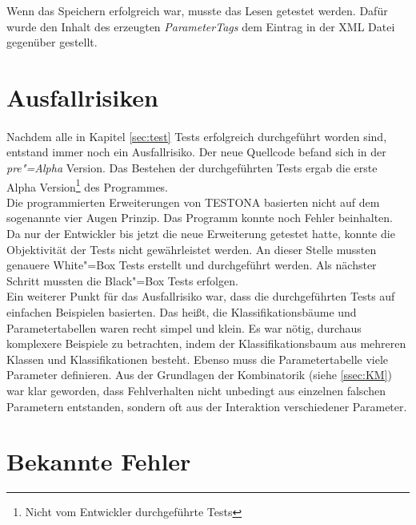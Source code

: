 Wenn das Speichern erfolgreich war, musste das Lesen getestet werden. Dafür wurde den Inhalt des erzeugten \textit{ParameterTags} dem Eintrag in der XML Datei gegenüber gestellt.



\newpage
\section{Ausfallrisiken}
\paragraph{}
Nachdem alle in Kapitel \ref{sec:test} Tests erfolgreich durchgeführt worden sind, entstand immer noch ein Ausfallrisiko. Der neue Quellcode befand sich in der \textit{pre"=Alpha} Version. Das Bestehen der durchgeführten Tests ergab die erste Alpha Version\footnote{Nicht vom Entwickler durchgeführte Tests} des Programmes.\\


Die programmierten Erweiterungen von TESTONA basierten nicht auf dem sogenannte \glqq vier Augen Prinzip\grqq. Das Programm konnte noch Fehler beinhalten. Da nur der Entwickler bis jetzt die neue Erweiterung getestet hatte, konnte die Objektivität der Tests nicht gewährleistet werden. An dieser Stelle mussten genauere White"=Box Tests erstellt und durchgeführt werden. Als nächster Schritt mussten die Black"=Box Tests erfolgen.\\


Ein weiterer Punkt für das Ausfallrisiko war, dass die durchgeführten Tests auf einfachen Beispielen basierten. Das heißt, die Klassifikationsbäume und Parametertabellen waren recht simpel und klein. Es war nötig, durchaus komplexere Beispiele zu betrachten, indem der Klassifikationsbaum aus mehreren Klassen und Klassifikationen besteht. Ebenso muss die Parametertabelle viele Parameter definieren. Aus der Grundlagen der Kombinatorik (siehe \ref{ssec:KM}) war klar geworden, dass Fehlverhalten nicht unbedingt aus einzelnen falschen Parametern entstanden, sondern oft aus der Interaktion verschiedener Parameter.


\newpage
\section{Bekannte Fehler}
